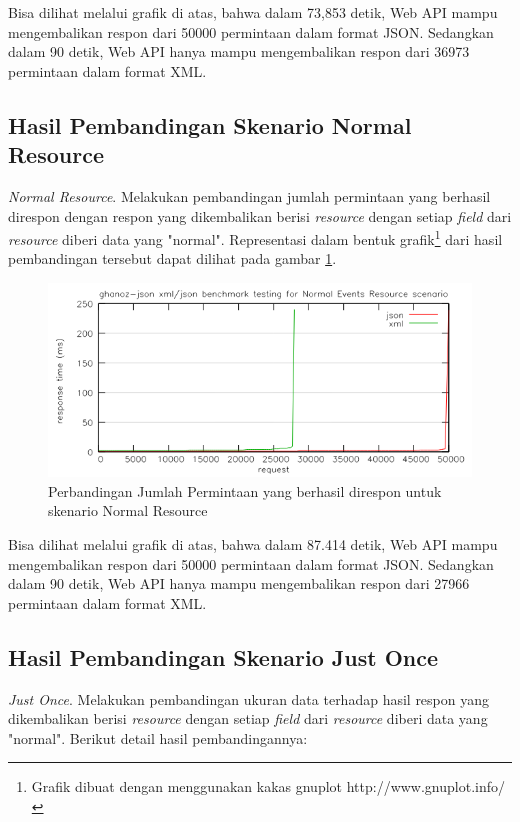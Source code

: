 \documentclass[a4paper, 12pt, oneside]{report}
\begin{document}
Bisa dilihat melalui grafik di atas, bahwa dalam 73,853 detik, Web API mampu mengembalikan respon dari 50000 permintaan dalam format JSON. Sedangkan dalam 90 detik, Web API hanya mampu mengembalikan respon dari 36973 permintaan dalam format XML.

\subsection{Hasil Pembandingan Skenario Normal Resource}

\onehalfspacing \textit{Normal Resource}. Melakukan pembandingan jumlah permintaan yang berhasil direspon dengan respon yang dikembalikan berisi \textit{resource} dengan setiap \textit{field} dari \textit{resource} diberi data yang "normal". Representasi dalam bentuk grafik\footnote{Grafik dibuat dengan menggunakan kakas gnuplot http://www.gnuplot.info/} dari hasil pembandingan tersebut dapat dilihat pada gambar \ref{benchmark-normal-resource}.

\begin{figure}[htp]
\centering
\includegraphics[scale=0.65]{images/benchmark-normal-resource.png}
\caption{Perbandingan Jumlah Permintaan yang berhasil direspon untuk skenario Normal Resource}
\label{benchmark-normal-resource}
\end{figure}

Bisa dilihat melalui grafik di atas, bahwa dalam 87.414 detik, Web API mampu mengembalikan respon dari 50000 permintaan dalam format JSON. Sedangkan dalam 90 detik, Web API hanya mampu mengembalikan respon dari 27966 permintaan dalam format XML.

\subsection{Hasil Pembandingan Skenario Just Once}

\onehalfspacing \textit{Just Once}. Melakukan pembandingan ukuran data terhadap hasil respon yang dikembalikan berisi \textit{resource} dengan setiap \textit{field} dari \textit{resource} diberi data yang "normal". Berikut detail hasil pembandingannya:
\end{document}
